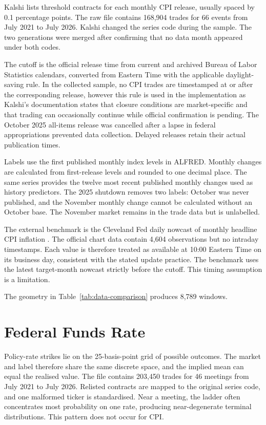 \documentclass[12pt,a4paper]{report}
\begin{document}
Kalshi lists threshold contracts for each monthly CPI release, usually spaced
by 0.1 percentage points. The raw file contains 168{,}904 trades for 66 events
from July 2021 to July 2026. Kalshi changed the series code during the sample.
The two generations were merged after confirming that no data month appeared
under both codes.

The cutoff is the official release time from current and archived Bureau of
Labor Statistics calendars, converted from Eastern Time with the applicable
daylight-saving rule. In the collected sample, no CPI trades are timestamped at or after the corresponding release, however this rule is used in the implementation as Kalshi’s documentation states that closure conditions are market-specific and that trading can occasionally continue while official confirmation is pending. The October 2025 all-items release was cancelled after a
lapse in federal appropriations prevented data collection. Delayed releases
retain their actual publication times.

Labels use the first published monthly index levels in ALFRED. Monthly changes
are calculated from first-release levels and rounded to one decimal place. The
same series provides the twelve most recent published monthly changes used as
history predictors. The 2025 shutdown removes two labels: October was never
published, and the November monthly change cannot be calculated without an
October base. The November market remains in the trade data but is unlabelled.

The external benchmark is the Cleveland Fed daily nowcast of monthly headline
CPI inflation \parencite{knotek2017}. The official chart data contain
4{,}604 observations but no intraday timestamps. Each value is therefore
treated as available at 10:00 Eastern Time on its business day, consistent with
the stated update practice. The benchmark uses the latest target-month nowcast
strictly before the cutoff. This timing assumption is a limitation.

The geometry in Table~\ref{tab:data-comparison} produces 8{,}789 windows.


\section{Federal Funds Rate}
\label{sec:data-ffr}

Policy-rate strikes lie on the 25-basis-point grid of possible outcomes. The
market and label therefore share the same discrete space, and the implied mean
can equal the realised value. The file contains 203{,}450 trades for 46
meetings from July 2021 to July 2026. Relisted contracts are mapped to the
original series code, and one malformed ticker is standardised. Near a meeting,
the ladder often concentrates most probability on one rate, producing
near-degenerate terminal distributions. This pattern does not occur for CPI.
\end{document}
